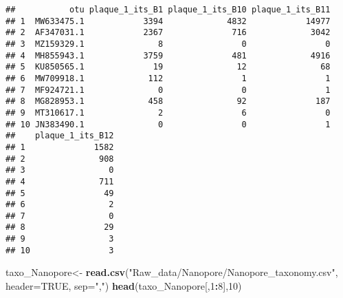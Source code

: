 \documentclass[
]{article}
\newenvironment{Shaded}{\begin{snugshade}}{\end{snugshade}}
\newcommand{\AttributeTok}[1]{\textcolor[rgb]{0.13,0.29,0.53}{#1}}
\newcommand{\ConstantTok}[1]{\textcolor[rgb]{0.56,0.35,0.01}{#1}}
\newcommand{\DecValTok}[1]{\textcolor[rgb]{0.00,0.00,0.81}{#1}}
\newcommand{\FunctionTok}[1]{\textcolor[rgb]{0.13,0.29,0.53}{\textbf{#1}}}
\newcommand{\NormalTok}[1]{#1}
\newcommand{\OtherTok}[1]{\textcolor[rgb]{0.56,0.35,0.01}{#1}}
\newcommand{\SpecialCharTok}[1]{\textcolor[rgb]{0.81,0.36,0.00}{\textbf{#1}}}
\newcommand{\StringTok}[1]{\textcolor[rgb]{0.31,0.60,0.02}{#1}}
\begin{document}
\begin{verbatim}
##           otu plaque_1_its_B1 plaque_1_its_B10 plaque_1_its_B11
## 1  MW633475.1            3394             4832            14977
## 2  AF347031.1            2367              716             3042
## 3  MZ159329.1               8                0                0
## 4  MH855943.1            3759              481             4916
## 5  KU850565.1              19               12               68
## 6  MW709918.1             112                1                1
## 7  MF924721.1               0                0                1
## 8  MG828953.1             458               92              187
## 9  MT310617.1               2                6                0
## 10 JN383490.1               0                0                1
##    plaque_1_its_B12
## 1              1582
## 2               908
## 3                 0
## 4               711
## 5                49
## 6                 2
## 7                 0
## 8                29
## 9                 3
## 10                3
\end{verbatim}

\begin{Shaded}
\begin{Highlighting}[]
\NormalTok{taxo\_Nanopore}\OtherTok{\textless{}{-}} \FunctionTok{read.csv}\NormalTok{(}\StringTok{"Raw\_data/Nanopore/Nanopore\_taxonomy.csv"}\NormalTok{, }
                        \AttributeTok{header=}\ConstantTok{TRUE}\NormalTok{, }\AttributeTok{sep=}\StringTok{","}\NormalTok{)}
\FunctionTok{head}\NormalTok{(taxo\_Nanopore[,}\DecValTok{1}\SpecialCharTok{:}\DecValTok{8}\NormalTok{],}\DecValTok{10}\NormalTok{)}
\end{Highlighting}
\end{Shaded}
\end{document}
